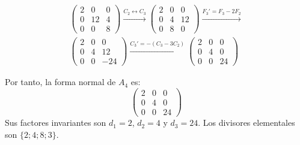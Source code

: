 \begin{ejercicio}
\begin{enumerate}
\begin{multline*}
\begin{pmatrix}
                2 & 0 & 0 \\
                0 & 12 & 4 \\
                0 & 0 & 8
            \end{pmatrix}
            \xrightarrow{C_2\leftrightarrow C_3}
            \begin{pmatrix}
                2 & 0 & 0 \\
                0 & 4 & 12 \\
                0 & 8 & 0
            \end{pmatrix}
            \xrightarrow{F_3'=F_3-2F_2}\\
            \begin{pmatrix}
                2 & 0 & 0 \\
                0 & 4 & 12 \\
                0 & 0 & -24
            \end{pmatrix}
            \xrightarrow{C_3'=-(C_3-3C_2)}
            \begin{pmatrix}
                2 & 0 & 0 \\
                0 & 4 & 0 \\
                0 & 0 & 24
            \end{pmatrix}
        \end{multline*}

        Por tanto, la forma normal de $A_4$ es:
        \begin{equation*}
            \begin{pmatrix}
                2 & 0 & 0 \\
                0 & 4 & 0 \\
                0 & 0 & 24
            \end{pmatrix}
        \end{equation*}
        Sus factores invariantes son $d_1=2$, $d_2=4$ y $d_3=24$.
        Los divisores elementales son $\{2; 4; 8; 3\}$.
    \end{enumerate}
\end{ejercicio}

